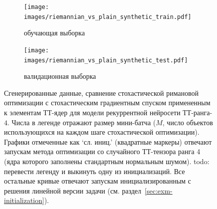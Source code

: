 %
%

\begin{figure}
    \centering
    \begin{subfigure}[b]{\textwidth}
        \texttt{[image: images/riemannian\_vs\_plain\_synthetic\_train.pdf]}
        \caption{обучающая выборка}
    \end{subfigure}
    \begin{subfigure}[b]{\textwidth}
        \texttt{[image: images/riemannian\_vs\_plain\_synthetic\_test.pdf]}
        \caption{валидационная выборка}
    \end{subfigure}
    \caption{Сгенерированные данные, сравнение стохастической римановой оптимизации с стохастическим градиентным спуском примененным к элементам ТТ-ядер для модели рекуррентной нейросети ТТ-ранга-$4$. Числа в легенде отражают размер мини-батча ($M$, число объектов использующихся на каждом шаге стохастической оптимизации). Графики отмеченные как `сл. иниц.' (квадратные  маркеры) отвечают запускам метода оптимизации со случайного ТТ-тензора ранга 4 (ядра которого заполнены стандартным нормальным шумом). \alert{todo: перевести легенду и выкинуть одну из инициализаций}.
Все остальные кривые отвечают запускам инициализированным с решения линейной версии задачи (см. раздел~\ref{sec:exm-initialization}).}\label{fig:riemannian-vs-plain-synthetic}
\end{figure}
%
%
